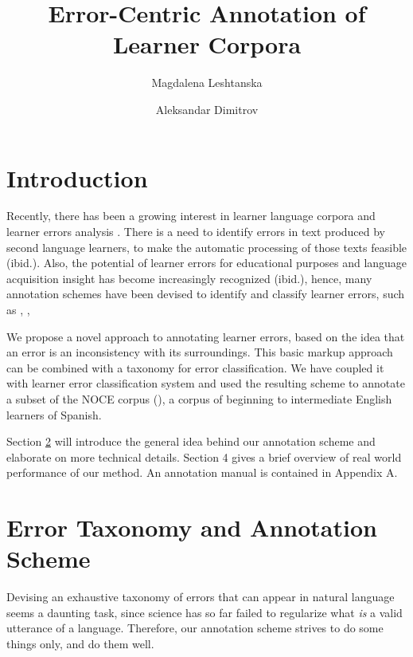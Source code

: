 \documentclass[12pt]{article}
\author{Magdalena Leshtanska \and Aleksandar Dimitrov}
\title{Error-Centric Annotation of Learner Corpora}
\begin{document}
\maketitle

\newtheorem{thm}{Theorem}[section]
\newtheorem{definition}[thm]{Definition}

\tableofcontents
{}

\section{Introduction}\label{sec:intro}

Recently, there has been a growing interest in learner language corpora and
learner errors analysis \cite{nessel}. There is a need to identify errors in
text produced by second language learners, to make the automatic processing of
those texts feasible (ibid.). Also, the potential of learner errors for
educational purposes and language acquisition insight has become increasingly
recognized (ibid.), hence, many annotation schemes have been devised to
identify and classify learner errors, such as \cite{negrillo}, \cite{CLC},
\cite{ludeling}

We propose a novel approach to annotating learner errors, based on the idea that
an error is an inconsistency with its surroundings. This basic markup approach
can be  combined with a taxonomy for error classification. We
have coupled it with learner error  classification system and used the resulting
scheme to annotate a subset of the NOCE corpus (\cite{negrilloph}), a corpus of
beginning to intermediate English learners of Spanish.

Section \ref{sec:scheme} will introduce the general idea behind our annotation
scheme and elaborate on more technical details. Section 4 gives a brief overview
of real world performance of our method. An annotation manual is contained in
Appendix A.

\section{Error Taxonomy and Annotation Scheme}\label{sec:scheme}

Devising an exhaustive taxonomy of errors that can appear in natural language
seems a daunting task, since science has so far failed to regularize what
\textit{is} a valid utterance of a language.  Therefore, our annotation scheme
strives  to  do some things only, and do them well.
\end{document}
